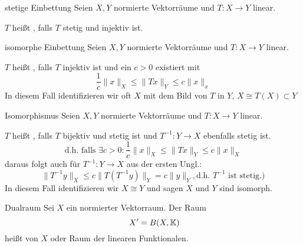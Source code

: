 	\begin{karte}{stetige Einbettung}
		Seien $X, Y$ normierte Vektorräume und $T: X \rightarrow Y$ linear.
	
		$T$ hei{\ss}t , falls $T$ stetig und injektiv ist.
	\end{karte}

	\begin{karte}{isomorphe Einbettung}
		Seien $X, Y$ normierte Vektorräume und $T: X \rightarrow Y$ linear.
		
	$T$ hei{\ss}t , falls $T$ injektiv ist und ein $c > 0$ existiert mit
			\[ \frac{1}{c} \| x \|_{X} \leq \| Tx \|_{Y} \leq c \| x \|_{x} \]
			In diesem Fall identifizieren wir oft $X$ mit dem Bild von $T$ in $Y$, $X \cong T(X) \subset Y$
	\end{karte}
	
	\begin{karte}{Isomorphismus}
		Seien $X, Y$ normierte Vektorräume und $T: X \rightarrow Y$ linear.
		
	$T$ hei{\ss}t , falls $T$ bijektiv und stetig ist und $T^{-1}: Y \rightarrow X$ ebenfalls stetig ist. 
			\[ \text{d.h. falls } \exists c > 0: \frac{1}{c} \| x \|_{X} \leq \| T x \|_{Y} \leq c \| x \|_{X} \]
			daraus folgt auch für $T^{-1}: Y \rightarrow X$ aus der ersten Ungl.:
			\[ \| T^{-1}y \|_{X} \leq c \| T (T^{-1}y) \|_{Y} = c \| y \|_{Y}, \text{d.h. } T^{-1} \text{ ist stetig.)}\]
			In diesem Fall identifizieren wir $X \cong Y$ und sagen $X$ und $Y$ sind isomorph.
	\end{karte}
	
	\begin{karte}{Dualraum}
		Sei $X$ ein normierter Vektorraum. Der Raum
 		\[ X' = B(X, \MdK) \]	
 		hei{\ss}t  von $X$ oder Raum der linearen Funktionalen.
	\end{karte}